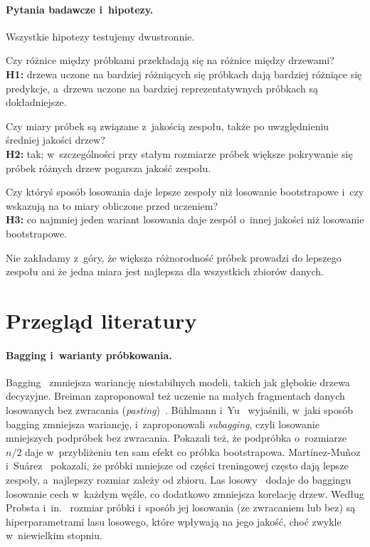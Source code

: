 \documentclass[11pt,a4paper]{article}
\begin{document}
\paragraph{Pytania badawcze i~hipotezy.} Wszystkie hipotezy testujemy dwustronnie.
\begin{description}[leftmargin=1.2cm,style=nextline]
  \item[PB1] Czy różnice między próbkami przekładają się na różnice między drzewami?\\
  \textbf{H1:} drzewa uczone na bardziej różniących się próbkach dają bardziej różniące się predykcje, a~drzewa uczone na bardziej reprezentatywnych próbkach są dokładniejsze.
  \item[PB2] Czy miary próbek są związane z~jakością zespołu, także po uwzględnieniu średniej jakości drzew?\\
  \textbf{H2:} tak; w~szczególności przy stałym rozmiarze próbek większe pokrywanie się próbek różnych drzew pogarsza jakość zespołu.
  \item[PB3] Czy któryś sposób losowania daje lepsze zespoły niż losowanie bootstrapowe i~czy wskazują na to miary obliczone przed uczeniem?\\
  \textbf{H3:} co najmniej jeden wariant losowania daje zespół o~innej jakości niż losowanie bootstrapowe.
\end{description}

Nie zakładamy z~góry, że większa różnorodność próbek prowadzi do lepszego zespołu ani że jedna miara jest najlepsza dla wszystkich zbiorów danych.

\section{Przegląd literatury}

\paragraph{Bagging i~warianty próbkowania.} Bagging~\cite{breiman1996} zmniejsza wariancję niestabilnych modeli, takich jak głębokie drzewa decyzyjne. Breiman zaproponował też uczenie na małych fragmentach danych losowanych bez zwracania (\emph{pasting})~\cite{breiman1999}. Bühlmann i~Yu~\cite{buhlmann2002} wyjaśnili, w~jaki sposób bagging zmniejsza wariancję, i~zaproponowali \emph{subagging}, czyli losowanie mniejszych podpróbek bez zwracania. Pokazali też, że podpróbka o~rozmiarze $n/2$ daje w~przybliżeniu ten sam efekt co próbka bootstrapowa. Martínez-Muñoz i~Suárez~\cite{martinez2010} pokazali, że próbki mniejsze od części treningowej często dają lepsze zespoły, a~najlepszy rozmiar zależy od zbioru. Las losowy~\cite{breiman2001} dodaje do baggingu losowanie cech w~każdym węźle, co dodatkowo zmniejsza korelację drzew. Według Probsta i~in.~\cite{probst2019} rozmiar próbki i~sposób jej losowania (ze zwracaniem lub bez) są hiperparametrami lasu losowego, które wpływają na jego jakość, choć zwykle w~niewielkim stopniu.
\end{document}
